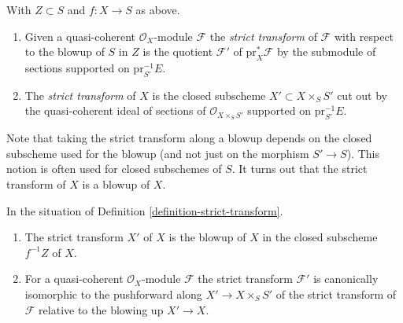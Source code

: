 \begin{definition}
\label{definition-strict-transform}
With $Z \subset S$ and $f : X \to S$ as above.
\begin{enumerate}
\item Given a quasi-coherent $\mathcal{O}_X$-module $\mathcal{F}$
the {\it strict transform} of $\mathcal{F}$ with respect to the blowup
of $S$ in $Z$ is the quotient $\mathcal{F}'$ of $\text{pr}_X^*\mathcal{F}$
by the submodule of sections supported on $\text{pr}_{S'}^{-1}E$.
\item The {\it strict transform} of $X$ is the closed subscheme
$X' \subset X \times_S S'$ cut out by the quasi-coherent ideal of
sections of $\mathcal{O}_{X \times_S S'}$ supported on $\text{pr}_{S'}^{-1}E$.
\end{enumerate}
\end{definition}

\noindent
Note that taking the strict transform along a blowup depends on the
closed subscheme used for the blowup
(and not just on the morphism $S' \to S$).
This notion is often used for closed subschemes of $S$.
It turns out that the strict transform of $X$ is a blowup of $X$.

\begin{lemma}
\label{lemma-strict-transform}
In the situation of Definition \ref{definition-strict-transform}.
\begin{enumerate}
\item The strict transform $X'$ of $X$ is the blowup of $X$ in the closed
subscheme $f^{-1}Z$ of $X$.
\item For a quasi-coherent $\mathcal{O}_X$-module $\mathcal{F}$ the
strict transform $\mathcal{F}'$ is canonically isomorphic to
the pushforward along $X' \to X \times_S S'$ of the strict transform of
$\mathcal{F}$ relative to the blowing up $X' \to X$.
\end{enumerate}
\end{lemma}

